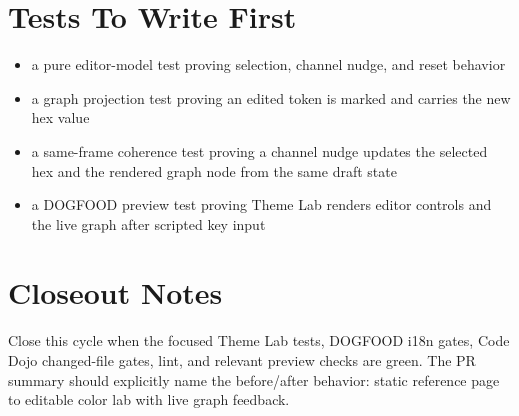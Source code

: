 \section{Tests To Write First}\label{record-187-tests-to-write-first}

\begin{itemize}
\tightlist
\item
  a pure editor-model test proving selection, channel nudge, and reset behavior
\item
  a graph projection test proving an edited token is marked and carries the new hex value
\item
  a same-frame coherence test proving a channel nudge updates the selected hex and the rendered graph node from the same draft state
\item
  a DOGFOOD preview test proving Theme Lab renders editor controls and the live graph after scripted key input
\end{itemize}

\section{Closeout Notes}\label{record-187-closeout-notes}

Close this cycle when the focused Theme Lab tests, DOGFOOD i18n gates, Code Dojo changed-file gates, lint, and relevant preview checks are green. The PR summary should explicitly name the before/after behavior: static reference page to editable color lab with live graph feedback.

